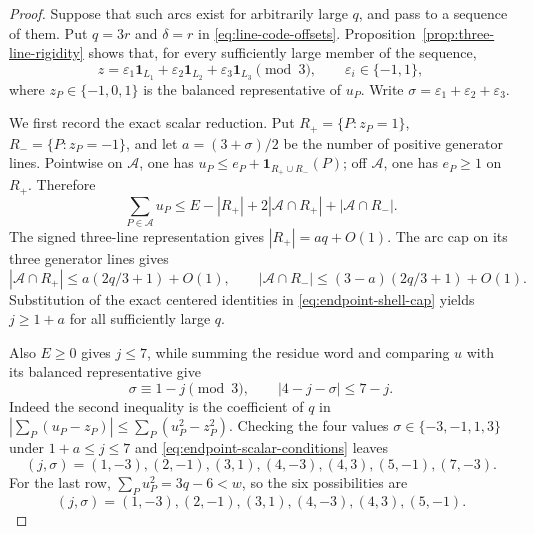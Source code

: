 \begin{proof}
Suppose that such arcs exist for arbitrarily large \(q\), and pass to a
sequence of them.  Put \(q=3r\) and \(\delta=r\) in
\eqref{eq:line-code-offsets}.  Proposition~\ref{prop:three-line-rigidity}
shows that, for every sufficiently large member of the sequence,
\[
 z=\varepsilon_1\mathbf1_{L_1}
   +\varepsilon_2\mathbf1_{L_2}
   +\varepsilon_3\mathbf1_{L_3}\pmod3,
 \qquad \varepsilon_i\in\{-1,1\},
\]
where \(z_P\in\{-1,0,1\}\) is the balanced representative of \(u_P\).
Write \(\sigma=\varepsilon_1+\varepsilon_2+\varepsilon_3\).

We first record the exact scalar reduction.  Put
\(R_+=\{P:z_P=1\}\), \(R_-=\{P:z_P=-1\}\), and let
\(a=(3+\sigma)/2\) be the number of positive generator lines.  Pointwise
on \(\mathcal A\), one has
\(u_P\le e_P+\mathbf1_{R_+\cup R_-}(P)\); off \(\mathcal A\), one has
\(e_P\ge1\) on \(R_+\).  Therefore
\begin{equation}\label{eq:endpoint-shell-cap}
 \sum_{P\in\mathcal A}u_P
 \le E-|R_+|+2|\mathcal A\cap R_+|
       +|\mathcal A\cap R_-|.
\end{equation}
The signed three-line representation gives
\(|R_+|=aq+O(1)\).  The arc cap on its three generator lines gives
\[
 |\mathcal A\cap R_+|\le a(2q/3+1)+O(1),\qquad
 |\mathcal A\cap R_-|\le(3-a)(2q/3+1)+O(1).
\]
Substitution of the exact centered identities in
\eqref{eq:endpoint-shell-cap} yields \(j\ge1+a\) for all sufficiently
large \(q\).

Also \(E\ge0\) gives \(j\le7\), while summing the residue word and comparing
\(u\) with its balanced representative give
\begin{equation}\label{eq:endpoint-scalar-conditions}
 \sigma\equiv1-j\pmod3,
 \qquad
 |4-j-\sigma|\le7-j.
\end{equation}
Indeed the second inequality is the coefficient of \(q\) in
\(\left|\sum_P(u_P-z_P)\right|\le\sum_P(u_P^2-z_P^2)\).
Checking the four values \(\sigma\in\{-3,-1,1,3\}\) under
\(1+a\le j\le7\) and \eqref{eq:endpoint-scalar-conditions} leaves
\[
 (j,\sigma)=(1,-3),(2,-1),(3,1),(4,-3),(4,3),(5,-1),(7,-3).
\]
For the last row, \(\sum_Pu_P^2=3q-6<w\), so the six possibilities are
\begin{equation}\label{eq:endpoint-six-rows}
 (j,\sigma)=(1,-3),(2,-1),(3,1),(4,-3),(4,3),(5,-1).
\end{equation}


\end{proof}
